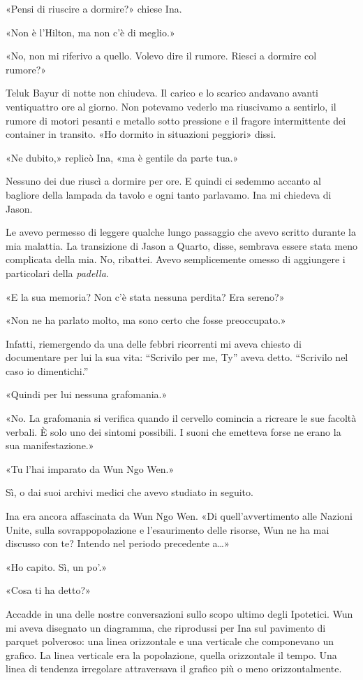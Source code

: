 «Pensi di riuscire a dormire?» chiese Ina.

«Non è l'Hilton, ma non c'è di meglio.»

«No, non mi riferivo a quello. Volevo dire il rumore. Riesci a dormire
col rumore?»

Teluk Bayur di notte non chiudeva. Il carico e lo scarico andavano
avanti ventiquattro ore al giorno. Non potevamo vederlo ma riuscivamo a
sentirlo, il rumore di motori pesanti e metallo sotto pressione e il
fragore intermittente dei container in transito. «Ho dormito in
situazioni peggiori» dissi.

«Ne dubito,» replicò Ina, «ma è gentile da parte tua.»

Nessuno dei due riuscì a dormire per ore. E quindi ci sedemmo accanto al
bagliore della lampada da tavolo e ogni tanto parlavamo. Ina mi chiedeva
di Jason.

Le avevo permesso di leggere qualche lungo passaggio che avevo scritto
durante la mia malattia. La transizione di Jason a Quarto, disse,
sembrava essere stata meno complicata della mia. No, ribattei. Avevo
semplicemente omesso di aggiungere i particolari della \emph{padella}.

«E la sua memoria? Non c'è stata nessuna perdita? Era sereno?»

«Non ne ha parlato molto, ma sono certo che fosse preoccupato.»

Infatti, riemergendo da una delle febbri ricorrenti mi aveva chiesto di
documentare per lui la sua vita: ``Scrivilo per me, Ty'' aveva detto.
``Scrivilo nel caso io dimentichi.''

«Quindi per lui nessuna grafomania.»

«No. La grafomania si verifica quando il cervello comincia a ricreare le
sue facoltà verbali. È solo uno dei sintomi possibili. I suoni che
emetteva forse ne erano la sua manifestazione.»

«Tu l'hai imparato da Wun Ngo Wen.»

Sì, o dai suoi archivi medici che avevo studiato in seguito.

Ina era ancora affascinata da Wun Ngo Wen. «Di quell'avvertimento alle
Nazioni Unite, sulla sovrappopolazione e l'esaurimento delle risorse,
Wun ne ha mai discusso con te? Intendo nel periodo precedente a\ldots»

«Ho capito. Sì, un po'.»

«Cosa ti ha detto?»

Accadde in una delle nostre conversazioni sullo scopo ultimo degli
Ipotetici. Wun mi aveva disegnato un diagramma, che riprodussi per Ina
sul pavimento di parquet polveroso: una linea orizzontale e una
verticale che componevano un grafico. La linea verticale era la
popolazione, quella orizzontale il tempo. Una linea di tendenza
irregolare attraversava il grafico più o meno orizzontalmente.

